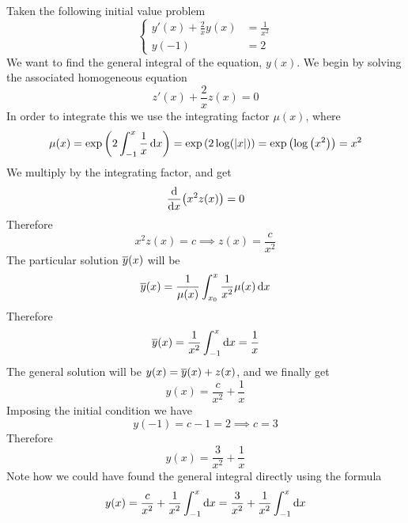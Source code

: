 \documentclass[../complete.tex]{subfiles}
\begin{document}
\begin{eg}
	Taken the following initial value problem
	\begin{equation*}
		\left\{ \begin{aligned}
				y'(x)+\frac{2}{x}y(x)&=\frac{1}{x^2}\\
				y(-1)&=2
		\end{aligned}\right.
	\end{equation*}
	We want to find the general integral of the equation, $y(x)$. We begin by solving the associated homogeneous equation
	\begin{equation*}
		z'(x)+\frac{2}{x}z(x)=0
	\end{equation*}
	In order to integrate this we use the integrating factor $\mu(x)$, where
	\begin{equation*}
		\mu(x)=\exp\left( 2\int_{-1}^{x}\frac{1}{x}\operatorname{d\!} x \right)=\exp\left( 2\log(\abs{x}) \right)=\exp\left( \log\left( x^2 \right) \right)=x^2
	\end{equation*}
	We multiply by the integrating factor, and get
	\begin{equation*}
		\derivative{x}(x^2z(x))=0
	\end{equation*}
	Therefore
	\begin{equation*}
		x^2z(x)=c\implies{} z(x)=\frac{c}{x^2}
	\end{equation*}
	The particular solution $\overline{y}(x)$ will be
	\begin{equation*}
		\overline{y}(x)=\frac{1}{\mu(x)}\int_{x_0}^{x}\frac{1}{x^2}\mu(x)\operatorname{d\!} x
	\end{equation*}
	Therefore
	\begin{equation*}
		\overline{y}(x)=\frac{1}{x^2}\int_{-1}^{x}\operatorname{d\!} x=\frac{1}{x}
	\end{equation*}
	The general solution will be $y(x)=\overline{y}(x)+z(x)$, and we finally get
	\begin{equation*}
		y(x)=\frac{c}{x^2}+\frac{1}{x}
	\end{equation*}
	Imposing the initial condition we have
	\begin{equation*}
		y(-1)=c-1=2\implies{} c=3
	\end{equation*}
	Therefore
	\begin{equation*}
		y(x)=\frac{3}{x^2}+\frac{1}{x}
	\end{equation*}
	Note how we could have found the general integral directly using the formula
	\begin{equation*}
		y(x)=\frac{c}{x^2}+\frac{1}{x^2}\int_{-1}^{x}\operatorname{d\!} x=\frac{3}{x^2}+\frac{1}{x^2}\int_{-1}^{x}\operatorname{d\!} x
	\end{equation*}
\end{eg}
\end{document}
